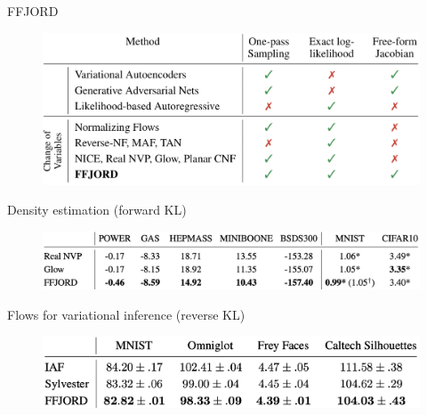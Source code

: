 \documentclass{beamer}
\begin{document}
\begin{frame}{FFJORD}
	\begin{figure}
		\centering
		\includegraphics[width=0.75\linewidth]{figs/flow_comparison.png}
	\end{figure}
	\vspace{-0.4cm}
	\begin{block}{Density estimation (forward KL)}
		\vspace{-0.2cm}
		\begin{figure}
			\centering
			\includegraphics[width=0.8\linewidth]{figs/ffjord_forward}
		\end{figure}
		\vspace{-0.5cm}
	\end{block}
	\begin{block}{Flows for variational inference (reverse KL)}
		\vspace{-0.2cm}
		\begin{figure}
			\centering
			\includegraphics[width=0.8\linewidth]{figs/ffjord_reverse}
		\end{figure}
	\end{block}

\end{frame}
\end{document}
